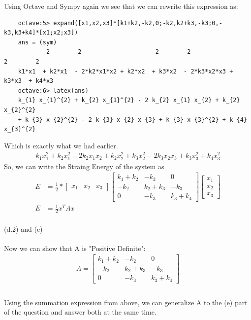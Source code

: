 \documentclass{article}
\begin{document}
	Using Octave and Sympy again we see that we can rewrite this expression as:\\
	\begin{verbatim}
	octave:5> expand([x1,x2,x3]*[k1+k2,-k2,0;-k2,k2+k3,-k3;0,-k3,k3+k4]*[x1;x2;x3])
	ans = (sym)
		    2        2                     2        2                     2        2
	k1*x1  + k2*x1  - 2*k2*x1*x2 + k2*x2  + k3*x2  - 2*k3*x2*x3 + k3*x3  + k4*x3
	octave:6> latex(ans)
	k_{1} x_{1}^{2} + k_{2} x_{1}^{2} - 2 k_{2} x_{1} x_{2} + k_{2} x_{2}^{2}
	+ k_{3} x_{2}^{2} - 2 k_{3} x_{2} x_{3} + k_{3} x_{3}^{2} + k_{4} x_{3}^{2}
	\end{verbatim}
	Which is exactly what we had earlier.
	\begin{align*}
	k_{1} x_{1}^{2} + k_{2} x_{1}^{2} - 2 k_{2} x_{1} x_{2} + k_{2} x_{2}^{2}
	+ k_{3} x_{2}^{2} - 2 k_{3} x_{2} x_{3} + k_{3} x_{3}^{2} + k_{4} x_{3}^{2}
	\end{align*}
	So, we can write the Straing Energy of the system as\\
	\begin{align*}
	E &=
	\frac{1}{2} *
	\begin{bmatrix}x_1&x_2&x_3\end{bmatrix}
	\begin{bmatrix}k_1+k_2&-k_2&0\\-k_2&k_2+k_3&-k_3\\0&-k_3&k_3+k_4\end{bmatrix}
	\begin{bmatrix}x_1\\x_2\\x_3\end{bmatrix}\\
	E &= \frac{1}{2}x^TAx
	\end{align*}
	\\
	(d.2) and (e)\\
	\\
	Now we can show that A is "Positive Definite":\\
	\begin{align*}
		A = \begin{bmatrix}k_1+k_2&-k_2&0\\-k_2&k_2+k_3&-k_3\\0&-k_3&k_3+k_4\end{bmatrix}\\
	\end{align*}
	\\
	Using the summation expression from above, we can generalize A to the (e) part of the question and answer both at the same time.\\
\end{document}
